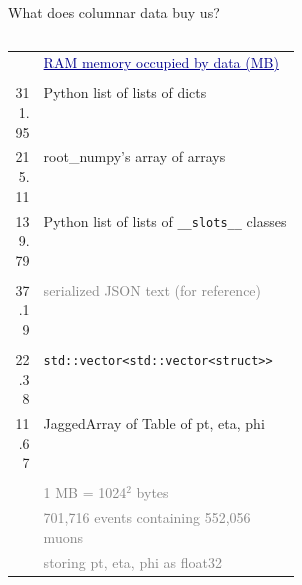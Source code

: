 \documentclass[aspectratio=169]{beamer}
\begin{document}
\begin{frame}{What does columnar data buy us?}
\vspace{0.5 cm}
\scriptsize

\begin{columns}
\begin{columns}
\begin{tabular}{r p{0.9\linewidth}}
& \textcolor{darkblue}{\small\underline{RAM memory occupied by data (MB)}} \\
& \\
311.95 & \textcolor{pythoncolor}{Python list of lists of dicts} \\
215.11 & \textcolor{rootnpcolor}{root\_numpy's array of arrays} \\
139.79 & \textcolor{pythoncolor}{Python list of lists of {\tt\scriptsize \_\_slots\_\_} classes} \\
& \\
 37.19 & \textcolor{gray}{serialized JSON text (for reference)} \\
& \\
 22.38 & \textcolor{cppcolor}{\tt\scriptsize std::vector<std::vector<struct>>} \\
 11.67 & \textcolor{mycolor}{JaggedArray of Table of pt, eta, phi} \\
& \\
& \textcolor{gray}{\scriptsize 1 MB = 1024$^2$ bytes} \\
& \textcolor{gray}{\scriptsize 701,716 events containing 552,056 muons} \\
& \textcolor{gray}{\scriptsize storing pt, eta, phi as float32} \\
\end{tabular}

\vspace{2.3 cm}


\end{columns}
\end{columns}
\end{frame}
\end{document}
